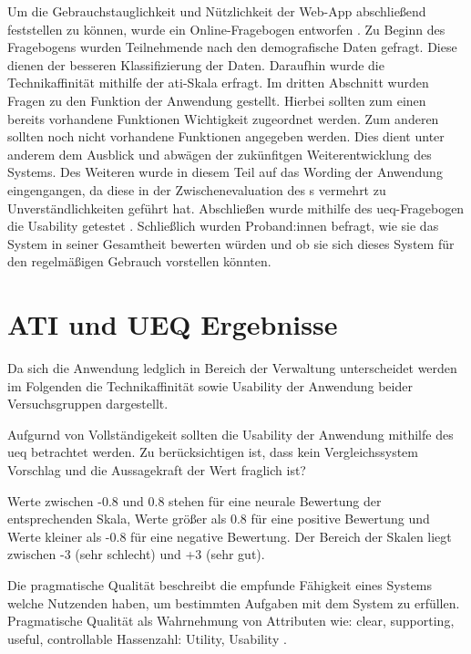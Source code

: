Um die Gebrauchstauglichkeit und Nützlichkeit der Web-App abschließend feststellen zu können, wurde
ein Online-Fragebogen entworfen . Zu Beginn des Fragebogens wurden
Teilnehmende nach den demografische Daten gefragt. Diese dienen der besseren Klassifizierung der
Daten. Daraufhin wurde die Technikaffinität mithilfe der \ac{ati}-Skala erfragt. Im dritten
Abschnitt wurden Fragen zu den Funktion der Anwendung gestellt. Hierbei sollten zum einen bereits
vorhandene Funktionen Wichtigkeit zugeordnet werden. Zum anderen sollten noch nicht vorhandene
Funktionen angegeben werden. Dies dient unter anderem dem Ausblick und abwägen der zukünfitgen
Weiterentwicklung des Systems. Des Weiteren wurde in diesem Teil auf das Wording der Anwendung
eingengangen, da diese in der Zwischenevaluation des s vermehrt zu
Unverständlichkeiten geführt hat. Abschließen wurde mithilfe des \ac{ueq}-Fragebogen die Usability
getestet \cite{burghardt_mensch_2018}. Schließlich wurden Proband:innen befragt, wie sie das System
in seiner Gesamtheit bewerten würden und ob sie sich dieses System für den regelmäßigen Gebrauch
vorstellen könnten.



\section{ATI und UEQ Ergebnisse}
Da sich die Anwendung ledglich in Bereich der Verwaltung unterscheidet werden im Folgenden die
Technikaffinität sowie Usability der Anwendung beider Versuchsgruppen dargestellt.

Aufgurnd von Vollständigekeit sollten die Usability der Anwendung mithilfe des \ac{ueq} betrachtet
werden. Zu berücksichtigen ist, dass kein Vergleichssystem Vorschlag und die Aussagekraft der Wert
fraglich ist?

Werte zwischen -0.8 und 0.8 stehen für eine neurale Bewertung der entsprechenden Skala, Werte größer
als 0.8 für eine positive Bewertung und Werte kleiner als -0.8 für eine negative Bewertung. Der
Bereich der Skalen liegt zwischen -3 (sehr schlecht) und +3 (sehr gut). 


Die pragmatische Qualität beschreibt die empfunde Fähigkeit eines Systems welche Nutzenden haben, um
bestimmten Aufgaben mit dem System zu erfüllen. Pragmatische Qualität als Wahrnehmung von Attributen
wie: clear, supporting, useful, controllable Hassenzahl: Utility, Usability
\cite{hassenzahl_thing_2004}.

